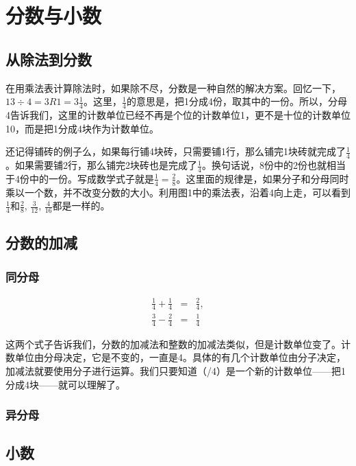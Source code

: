 
\chapter{分数与小数}
\section{从除法到分数}

在用乘法表计算除法时，如果除不尽，分数是一种自然的解决方案。回忆一下，$13\div4=3R1=3\frac{1}{4}$。这里，$\frac{1}{4}$的意思是，把1分成4份，取其中的一份。所以，分母4告诉我们，这里的计数单位已经不再是个位的计数单位1，更不是十位的计数单位10，而是把1分成4块作为计数单位。

还记得铺砖的例子么，如果每行铺4块砖，只需要铺1行，那么铺完1块砖就完成了$\frac{1}{4}$。如果需要铺2行，那么铺完2块砖也是完成了$\frac{1}{4}$。换句话说，8份中的2份也就相当于4份中的一份。写成数学式子就是$\frac{1}{4}=\frac{2}{8}$。这里面的规律是，如果分子和分母同时乘以一个数，并不改变分数的大小。利用图1中的乘法表，沿着4向上走，可以看到$\frac{1}{4}$和$\frac{2}{8}$, $\frac{3}{12}$, $\frac{4}{16}$都是一样的。


\section{分数的加减}

\subsection{同分母}

\begin{eqnarray}
\frac{1}{4} + \frac{1}{4} & = & \frac{2}{4},\\
\frac{3}{4} - \frac{2}{4} & = & \frac{1}{4}
\end{eqnarray}
    
    这两个式子告诉我们，分数的加减法和整数的加减法类似，但是计数单位变了。计数单位由分母决定，它是不变的，一直是4。具体的有几个计数单位由分子决定，加减法就要使用分子进行运算。我们只要知道（/4）是一个新的计数单位——把1分成4块——就可以理解了。

\subsection{异分母}

\section{小数}



